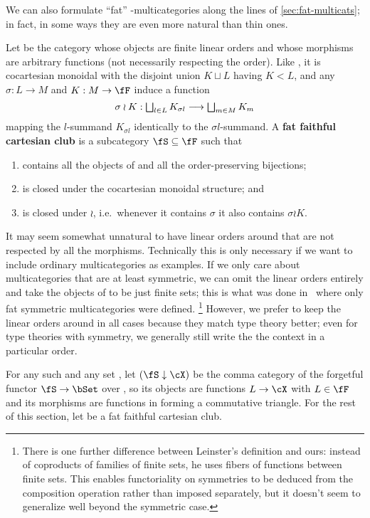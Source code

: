 \documentclass{book}
\begin{document}
We can also formulate ``fat'' \fS-multicategories along the lines of \cref{sec:fat-multicats}; in fact, in some ways they are even more natural than thin ones.

\begin{defn}
  Let \fF be the category whose objects are finite linear orders and whose morphisms are arbitrary functions (not necessarily respecting the order).
  Like \fN, it is cocartesian monoidal with the disjoint union $K\sqcup L$ having $K<L$, and any $\sigma:L\to M$ and $K:M\to \fF$ induce a function
  \[\sigma\wr K : \textstyle\bigsqcup_{l\in L} K_{\sigma l} \overset{}{\longrightarrow} \bigsqcup_{m\in M} K_m \]
  mapping the $l$-summand $K_{\sigma l}$ identically to the $\sigma l$-summand.
  A \textbf{fat faithful cartesian club} is a subcategory $\fS\subseteq \fF$ such that
  \begin{enumerate}
  \item \fS contains all the objects of \fF and all the order-preserving bijections;
  \item \fS is closed under the cocartesian monoidal structure; and
  \item \fS is closed under $\wr$, i.e.\ whenever it contains $\sigma$ it also contains $\sigma \wr K$.
  \end{enumerate}
\end{defn}

It may seem somewhat unnatural to have linear orders around that are not respected by all the morphisms.
Technically this is only necessary if we want to include ordinary multicategories as examples.
If we only care about multicategories that are at least symmetric, we can omit the linear orders entirely and take the objects of \fF to be just finite sets; this is what was done in~\cite[Appendix A]{leinster:higher-opds} where only fat symmetric multicategories were defined.%
\footnote{There is one further difference between Leinster's definition and ours: instead of coproducts of families of finite sets, he uses fibers of functions between finite sets.
  This enables functoriality on symmetries to be deduced from the composition operation rather than imposed separately, but it doesn't seem to generalize well beyond the symmetric case.}
However, we prefer to keep the linear orders around in all cases because they match type theory better; even for type theories with symmetry, we generally still write the the context in a particular order.

For any such \fS and any set \cX, let $(\fS\dn \cX)$ be the comma category of the forgetful functor $\fS\to \bSet$ over \cX, so its objects are functions $L\to \cX$ with $L\in\fF$ and its morphisms are functions in \fS forming a commutative triangle.
For the rest of this section, let \fS be a fat faithful cartesian club.
\end{document}
